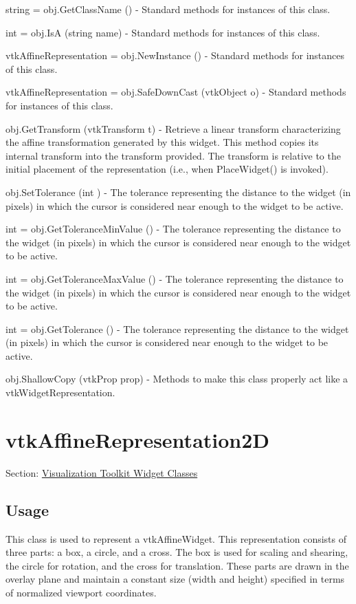 \begin{DoxyItemize}
\item {\ttfamily string = obj.\-Get\-Class\-Name ()} -\/ Standard methods for instances of this class.  
\item {\ttfamily int = obj.\-Is\-A (string name)} -\/ Standard methods for instances of this class.  
\item {\ttfamily vtk\-Affine\-Representation = obj.\-New\-Instance ()} -\/ Standard methods for instances of this class.  
\item {\ttfamily vtk\-Affine\-Representation = obj.\-Safe\-Down\-Cast (vtk\-Object o)} -\/ Standard methods for instances of this class.  
\item {\ttfamily obj.\-Get\-Transform (vtk\-Transform t)} -\/ Retrieve a linear transform characterizing the affine transformation generated by this widget. This method copies its internal transform into the transform provided. The transform is relative to the initial placement of the representation (i.\-e., when Place\-Widget() is invoked).  
\item {\ttfamily obj.\-Set\-Tolerance (int )} -\/ The tolerance representing the distance to the widget (in pixels) in which the cursor is considered near enough to the widget to be active.  
\item {\ttfamily int = obj.\-Get\-Tolerance\-Min\-Value ()} -\/ The tolerance representing the distance to the widget (in pixels) in which the cursor is considered near enough to the widget to be active.  
\item {\ttfamily int = obj.\-Get\-Tolerance\-Max\-Value ()} -\/ The tolerance representing the distance to the widget (in pixels) in which the cursor is considered near enough to the widget to be active.  
\item {\ttfamily int = obj.\-Get\-Tolerance ()} -\/ The tolerance representing the distance to the widget (in pixels) in which the cursor is considered near enough to the widget to be active.  
\item {\ttfamily obj.\-Shallow\-Copy (vtk\-Prop prop)} -\/ Methods to make this class properly act like a vtk\-Widget\-Representation.  
\end{DoxyItemize}\hypertarget{vtkwidgets_vtkaffinerepresentation2d}{}\section{vtk\-Affine\-Representation2\-D}\label{vtkwidgets_vtkaffinerepresentation2d}
Section\-: \hyperlink{sec_vtkwidgets}{Visualization Toolkit Widget Classes} \hypertarget{vtkwidgets_vtkxyplotwidget_Usage}{}\subsection{Usage}\label{vtkwidgets_vtkxyplotwidget_Usage}
This class is used to represent a vtk\-Affine\-Widget. This representation consists of three parts\-: a box, a circle, and a cross. The box is used for scaling and shearing, the circle for rotation, and the cross for translation. These parts are drawn in the overlay plane and maintain a constant size (width and height) specified in terms of normalized viewport coordinates.

